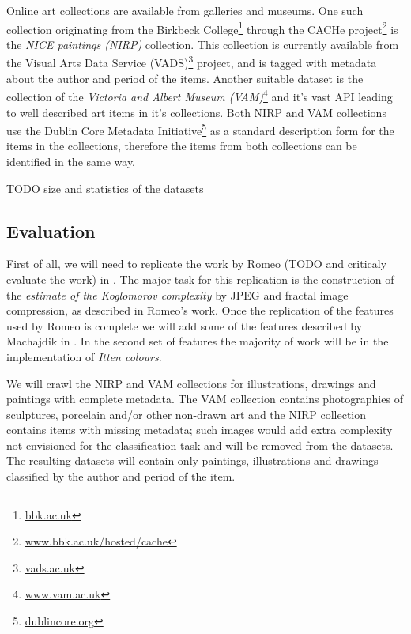 \documentclass[a4paper]{article}
\begin{document}
Online art collections are available from galleries and museums.  One such
collection originating from the Birkbeck College\footnote{
\href{http://www.bbk.ac.uk}{bbk.ac.uk}} through the CACHe project\footnote{
\href{http://www.bbk.ac.uk/hosted/cache/}{www.bbk.ac.uk/hosted/cache}} is the
\emph{NICE paintings (NIRP)} collection.  This collection is currently
available from the Visual Arts Data Service (VADS)\footnote{
\href{http://vads.ac.uk/}{vads.ac.uk}} project, and is tagged with metadata
about the author and period of the items.  Another suitable dataset is the
collection of the \emph{Victoria and Albert Museum (VAM)}\footnote{
\href{http://www.vam.ac.uk/}{www.vam.ac.uk}} and it's vast API leading to well
described art items in it's collections.  Both NIRP and VAM collections use the
Dublin Core Metadata Initiative\footnote{
\href{http://dublincore.org/}{dublincore.org}} as a standard description form
for the items in the collections, therefore the items from both collections can
be identified in the same way.

TODO size and statistics of the datasets


\subsection{Evaluation}

First of all, we will need to replicate the work by Romeo (TODO and criticaly
evaluate the work) in \cite{rmc12ajs}.
The major task for this replication is the construction of the \emph{estimate
of the Koglomorov complexity} by JPEG and fractal image compression, as
described in Romeo's work. Once the replication of the features used by Romeo
is complete we will add some of the features described by Machajdik in
\cite{mach10clas}.  In the second set of features the majority of work will be
in the implementation of \emph{Itten colours}.

We will crawl the NIRP and VAM collections for illustrations, drawings and
paintings with complete metadata.  The VAM collection contains photographies of
sculptures, porcelain and/or other non-drawn art and the NIRP collection
contains items with missing metadata; such images would add extra complexity
not envisioned for the classification task and will be removed from the
datasets.  The resulting datasets will contain only paintings, illustrations
and drawings classified by the author and period of the item.
\end{document}
